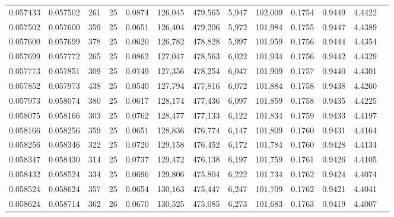 \begin{tabular}{rrrrrrrrrrrrr}
0.057433 & 0.057502 &   261 &  25 &                                     0.0874 & 126,045 & 479,565 &   5,947 & 102,009 & 0.1754 & 0.9449 & 4.4422 \\
0.057502 & 0.057600 &   359 &  25 &                                     0.0651 & 126,404 & 479,206 &   5,972 & 101,984 & 0.1755 & 0.9447 & 4.4389 \\
0.057600 & 0.057699 &   378 &  25 &                                     0.0620 & 126,782 & 478,828 &   5,997 & 101,959 & 0.1756 & 0.9444 & 4.4354 \\
0.057699 & 0.057772 &   265 &  25 &                                     0.0862 & 127,047 & 478,563 &   6,022 & 101,934 & 0.1756 & 0.9442 & 4.4329 \\
0.057773 & 0.057851 &   309 &  25 &                                     0.0749 & 127,356 & 478,254 &   6,047 & 101,909 & 0.1757 & 0.9440 & 4.4301 \\
0.057852 & 0.057973 &   438 &  25 &                                     0.0540 & 127,794 & 477,816 &   6,072 & 101,884 & 0.1758 & 0.9438 & 4.4260 \\
0.057973 & 0.058074 &   380 &  25 &                                     0.0617 & 128,174 & 477,436 &   6,097 & 101,859 & 0.1758 & 0.9435 & 4.4225 \\
0.058075 & 0.058166 &   303 &  25 &                                     0.0762 & 128,477 & 477,133 &   6,122 & 101,834 & 0.1759 & 0.9433 & 4.4197 \\
0.058166 & 0.058256 &   359 &  25 &                                     0.0651 & 128,836 & 476,774 &   6,147 & 101,809 & 0.1760 & 0.9431 & 4.4164 \\
0.058256 & 0.058346 &   322 &  25 &                                     0.0720 & 129,158 & 476,452 &   6,172 & 101,784 & 0.1760 & 0.9428 & 4.4134 \\
0.058347 & 0.058430 &   314 &  25 &                                     0.0737 & 129,472 & 476,138 &   6,197 & 101,759 & 0.1761 & 0.9426 & 4.4105 \\
0.058432 & 0.058524 &   334 &  25 &                                     0.0696 & 129,806 & 475,804 &   6,222 & 101,734 & 0.1762 & 0.9424 & 4.4074 \\
0.058524 & 0.058624 &   357 &  25 &                                     0.0654 & 130,163 & 475,447 &   6,247 & 101,709 & 0.1762 & 0.9421 & 4.4041 \\
0.058624 & 0.058714 &   362 &  26 &                                     0.0670 & 130,525 & 475,085 &   6,273 & 101,683 & 0.1763 & 0.9419 & 4.4007 \\

\end{tabular}
